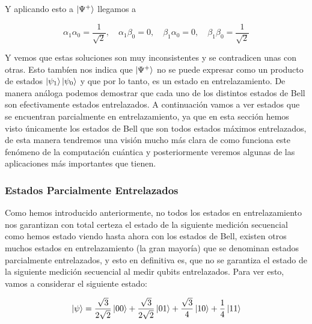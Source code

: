 \documentclass[12pt]{article}
\numberwithin{equation}{section} %
\begin{document}
    \vspace{2.5mm}

    Y aplicando esto a \( \ket{\Psi^{+}} \) llegamos a 

    \begin{equation*}
        \alpha_{1} \alpha_{0} = \frac{1}{\sqrt{2}}, \quad \alpha_{1} \beta_{0} = 0, \quad \beta_{1} \alpha_{0} = 0, \quad \beta_{1} \beta_{0} = \frac{1}{\sqrt{2}}
    \end{equation*}

    \vspace{2.5mm}

    Y vemos que estas soluciones son muy inconsistentes y se contradicen unas con otras. Esto tambíen nos indica que \( \ket{\Psi^{+}} \) no se puede expresar como un producto de estados \( \ket{\psi_{1}} \ket{\psi_{0}} \) y que por lo tanto, es un estado en entrelazamiento. De manera análoga podemos demostrar que cada uno de los distintos estados de Bell son efectivamente estados entrelazados. A continuación vamos a ver estados que se encuentran parcialmente en entrelazamiento, ya que en esta sección hemos visto únicamente los estados de Bell que son todos estados máximos entrelazados, de esta manera tendremos una visión mucho más clara de como funciona este fenómeno de la computación cuántica y posteriormente veremos algunas de las aplicaciones más importantes que tienen.

    \vspace{5mm}





    \subsubsection{Estados Parcialmente Entrelazados}

    \vspace{5mm}

    Como hemos introducido anteriormente, no todos los estados en entrelazamiento nos garantizan con total certeza el estado de la siguiente medición secuencial como hemos estado viendo hasta ahora con los estados de Bell, existen otros muchos estados en entrelazamiento (la gran mayoría) que se denominan estados parcialmente entrelazados, y esto en definitiva es, que no se garantiza el estado de la siguiente medición secuencial al medir qubits entrelazados. Para ver esto, vamos a considerar el siguiente estado:

    \begin{equation*}
        \ket{\psi} = \frac{\sqrt{3}}{2 \sqrt{2}} \ket{0 0} + \frac{\sqrt{3}}{2 \sqrt{2}} \ket{0 1} + \frac{\sqrt{3}}{4} \ket{1 0} + \frac{1}{4} \ket{1 1} 
    \end{equation*}
\end{document}
